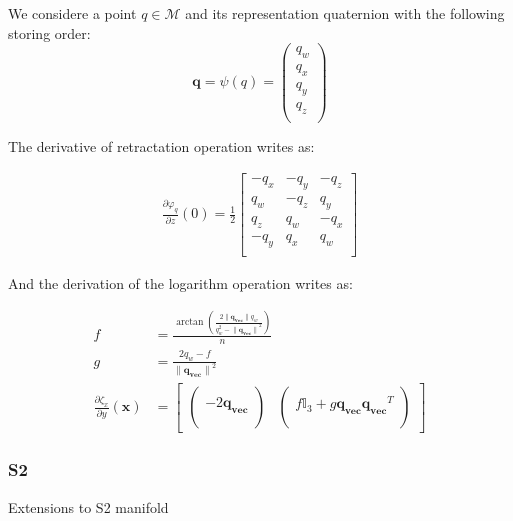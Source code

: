 We considere a point $q\in\mathcal{M}$ and its representation quaternion with the following storing order:
\begin{equation}
\mathbf{q}=\psi(q)
= \begin{pmatrix}
  q_w \\
  q_x \\
  q_y \\
  q_z \\
\end{pmatrix}
\end{equation}

The derivative of retractation operation writes as:

\begin{align}
\label{eq:diffRetrSO3Quat}
  \frac{\partial \varphi_q}{\partial z}(0) = \frac{1}{2}
  \begin{bmatrix}
    -q_x & -q_y & -q_z \\
     q_w & -q_z &  q_y \\
     q_z &  q_w & -q_x \\
    -q_y &  q_x &  q_w \\
  \end{bmatrix}
\end{align}

And the derivation of the logarithm operation writes as:

\begin{align}
\label{eq:diffLogSO3Quat}
  f &= \frac{\arctan \left( \frac{2 \|\mathbf{q_{vec}}\| q_w}{q_w^2 - {\|\mathbf{q_{vec}}\|}^2} \right)}{n}\\
  g &= \frac{2 q_w - f}{{\|\mathbf{q_{vec}}\|}^2} \\
  \frac{\partial \zeta_x}{\partial y}(\mathbf{x}) &= \begin{bmatrix}
  \begin{pmatrix}
    \\
    -2\mathbf{q_{vec}}\\
    \\
  \end{pmatrix} &
  \begin{pmatrix}
    \\
    f\mathbb{I}_3 + g\mathbf{q_{vec}}\mathbf{q_{vec}}^T\\
    \\
  \end{pmatrix}
  \end{bmatrix}
\end{align}

\subsubsection{S2}
\label{ssub:S2}
Extensions to S2 manifold




